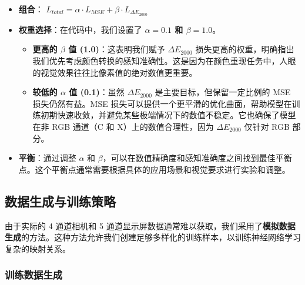 \begin{itemize}
    \item \textbf{组合}：
    $ L_{total} = \alpha \cdot L_{MSE} + \beta \cdot L_{\Delta E_{2000}} $
    \item \textbf{权重选择}：在代码中，我们设置了 \textbf{$\alpha=0.1$ 和 $\beta=1.0$}。
        \begin{itemize}
            \item \textbf{更高的 $\beta$ 值 (1.0)}：这表明我们赋予 $\Delta E_{2000}$ 损失更高的权重，明确指出我们优先考虑颜色转换的感知准确性。这是因为在颜色重现任务中，人眼的视觉效果往往比像素值的绝对数值更重要。
            \item \textbf{较低的 $\alpha$ 值 (0.1)}：虽然 $\Delta E_{2000}$ 是主要目标，但保留一定比例的 MSE 损失仍然有益。MSE 损失可以提供一个更平滑的优化曲面，帮助模型在训练初期快速收敛，并避免某些极端情况下的数值不稳定。它也确保了模型在非 RGB 通道（C 和 X）上的数值合理性，因为 $\Delta E_{2000}$ 仅针对 RGB 部分。
        \end{itemize}
    \item \textbf{平衡}：通过调整 $\alpha$ 和 $\beta$，可以在数值精确度和感知准确度之间找到最佳平衡点。这个平衡点通常需要根据具体的应用场景和视觉要求进行实验和调整。
\end{itemize}

\subsection[\hspace{-2pt}数据生成与训练策略]{{\heiti{} \hspace{-8pt}数据生成与训练策略}}\label{section2: 数据生成与训练策略}

由于实际的 4 通道相机和 5 通道显示屏数据通常难以获取，我们采用了\textbf{模拟数据生成}的方法。这种方法允许我们创建足够多样化的训练样本，以训练神经网络学习复杂的映射关系。

\subsubsection[\hspace{-2pt}训练数据生成]{{\heiti{} \hspace{-8pt}训练数据生成}}\label{section2: 训练数据生成}

